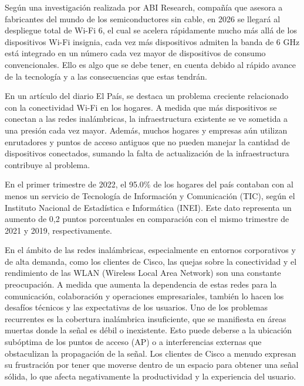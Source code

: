 Según una investigación realizada por ABI Research, compañía que asesora a fabricantes del mundo de los semiconductores sin cable, en 2026 se llegará al despliegue total de Wi-Fi 6, el cual se acelera rápidamente mucho más allá de los dispositivos Wi-Fi insignia, cada vez más dispositivos admiten la banda de 6 GHz está integrado en un número cada vez mayor de dispositivos de consumo convencionales. \cite{ot_zig2020abi} Ello es algo que se debe tener, en cuenta debido al rápido avance de la tecnología y a las consecuencias que estas tendrán.

En un artículo del diario El País, se destaca un problema creciente relacionado con la conectividad Wi-Fi en los hogares. A medida que más dispositivos se conectan a las redes inalámbricas, la infraestructura existente se ve sometida a una presión cada vez mayor. Además, muchos hogares y empresas aún utilizan enrutadores y puntos de acceso antiguos que no pueden manejar la cantidad de dispositivos conectados, sumando la falta de actualización de la infraestructura contribuye al problema. \cite{ot_elpais2023wifi}

En el primer trimestre de 2022, el 95.0\% de los hogares del país contaban con al menos un servicio de Tecnología de Información y Comunicación (TIC), según el Instituto Nacional de Estadística e Informática (INEI). Este dato representa un aumento de 0,2 puntos porcentuales en comparación con el mismo trimestre de 2021 y 2019, respectivamente.  \cite{ot_inei2022estati}

En el ámbito de las redes inalámbricas, especialmente en entornos corporativos y de alta demanda, como los clientes de Cisco, las quejas sobre la conectividad y el rendimiento de las WLAN (Wireless Local Area Network) son una constante preocupación. A medida que aumenta la dependencia de estas redes para la comunicación, colaboración y operaciones empresariales, también lo hacen los desafíos técnicos y las expectativas de los usuarios. Uno de los problemas recurrentes es la cobertura inalámbrica insuficiente, que se manifiesta en áreas muertas donde la señal es débil o inexistente. Esto puede deberse a la ubicación subóptima de los puntos de acceso (AP) o a interferencias externas que obstaculizan la propagación de la señal. Los clientes de Cisco a menudo expresan su frustración por tener que moverse dentro de un espacio para obtener una señal sólida, lo que afecta negativamente la productividad y la experiencia del usuario.  \cite{ot_cisco2022ap}

